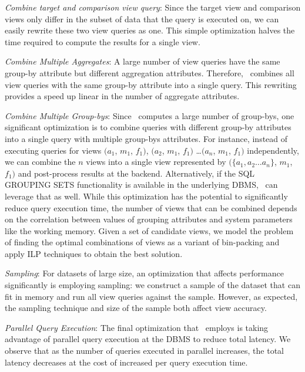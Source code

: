 \begin{denselist}
  \item {\it Combine target and comparison view query}: Since the target view
  and comparison views only differ in the subset of data that the query is
  executed on, we can easily rewrite these two view queries as one.
  This simple optimization halves the time required to compute the results for
  a single view.
  \item {\it Combine Multiple Aggregates}: A large number of view
  queries have the same group-by attribute but different aggregation attributes.
  Therefore, \VizRecDB\ combines all view queries with the same group-by attribute
  into a single query. This rewriting provides a speed up linear in the
  number of aggregate attributes.
  \item {\it Combine Multiple Group-bys}: 
  Since \VizRecDB\ computes a large number of group-bys, one significant
  optimization is to combine queries with different
  group-by attributes into a single query with multiple group-bys attributes.
  For instance, instead of executing queries for views $(a_1$, $m_1$, $f_1)$,
  $(a_2$, $m_1$, $f_1)$ \ldots $(a_n$, $m_1$, $f_1)$ independently, 
  we can combine the $n$ views into a single view represented by
  $(\{a_1, a_2\ldots a_n\}$, $m_1$, $f_1)$ and post-process results at the
  backend. Alternatively, if the SQL GROUPING SETS functionality is available in
  the underlying DBMS, \VizRecDB\ can leverage that as well. 
  While this optimization has the potential to significantly reduce query
  execution time, the number of views that can be combined depends
  on the correlation between values of grouping attributes and system parameters like the
  working memory. Given a set of candidate views, we model the
  problem of finding the optimal combinations of views as a variant of bin-packing and apply ILP techniques to obtain the best solution. 
  \item {\it Sampling}: For datasets of large size, an optimization that
  affects performance significantly is employing sampling: we  
  construct a sample of the dataset
  that can fit in memory and run all view queries against the sample. However, as
  expected, the sampling technique and size of the sample both affect
  view accuracy. 
  \item {\it Parallel Query Execution}: The final optimization that
  \VizRecDB\ employs is taking advantage of parallel query execution 
  at the DBMS to reduce total latency.
  We observe that as the number of queries executed in parallel
  increases, the total latency decreases at the cost of
  increased per query execution time.
\end{denselist}
